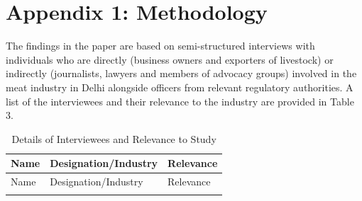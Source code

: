 \documentclass[a4paper, 12pt, twoside]{article}
\begin{document}
\section*{Appendix 1: Methodology}
The findings in the paper are based on semi-structured interviews with individuals who are directly (business owners and exporters of livestock) or indirectly (journalists, lawyers and members of advocacy groups) involved in the meat industry in Delhi alongside officers from relevant regulatory authorities. A list of the interviewees and their relevance to the industry are provided in Table 3. 
\footnotesize
 \begin{longtable}[l]{>{\raggedright}p{2cm}>{\raggedright}p{5cm}>{\raggedright\arraybackslash}p{7.5cm}}
\caption{Details of Interviewees and Relevance to Study} \\
\toprule
Name & Designation/Industry & Relevance \\
\midrule
\endfirsthead
\midrule
Name & Designation/Industry & Relevance \\
\midrule
\endhead
\endlastfoot
   

\end{longtable}
\end{document}
